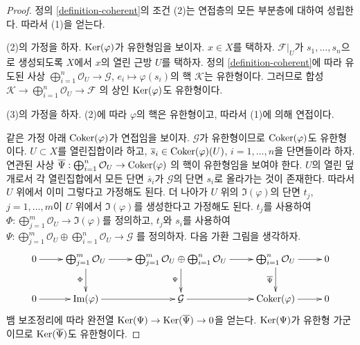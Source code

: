 \begin{proof}
정의 \ref{definition-coherent}의 조건 (2)는 연접층의 모든 부분층에
대하여 성립한다. 따라서 (1)을 얻는다.

\medskip\noindent
(2)의 가정을 하자.
$\mathop{\mathrm{Ker}}(\varphi)$가 유한형임을 보이자. $x \in X$를 택하자.
$\mathcal{F}|_U$가 $s_1, \ldots, s_n$으로 생성되도록
$X$에서 $x$의 열린 근방 $U$를 택하자.
정의 \ref{definition-coherent}에 따라 유도된 사상
$\bigoplus_{i = 1}^n \mathcal{O}_U \to \mathcal{G}$,
$e_i \mapsto \varphi(s_i)$의 핵 $\mathcal{K}$는 유한형이다.
그러므로 합성
$\mathcal{K} \to \bigoplus_{i = 1}^n \mathcal{O}_U \to \mathcal{F}$
의 상인 $\mathop{\mathrm{Ker}}(\varphi)$도 유한형이다.

\medskip\noindent
(3)의 가정을 하자.
(2)에 따라 $\varphi$의 핵은 유한형이고, 따라서 (1)에 의해 연접이다.

\medskip\noindent
같은 가정 아래 $\mathop{\mathrm{Coker}}(\varphi)$가 연접임을 보이자.
$\mathcal{G}$가 유한형이므로 $\mathop{\mathrm{Coker}}(\varphi)$도 유한형이다.
$U \subset X$를 열린집합이라 하고,
$\overline{s}_i \in \mathop{\mathrm{Coker}}(\varphi)(U)$, $i = 1, \ldots, n$을 단면들이라 하자.
연관된 사상
$\overline{\Psi} : \bigoplus_{i = 1}^n \mathcal{O}_U \to \mathop{\mathrm{Coker}}(\varphi)$
의 핵이 유한형임을 보여야 한다. $U$의 열린 덮개로서 각 열린집합에서
모든 단면 $\overline{s}_i$가 $\mathcal{G}$의 단면 $s_i$로 올라가는 것이
존재한다. 따라서 $U$ 위에서 이미 그렇다고 가정해도 된다.
더 나아가 $U$ 위의 $\Im(\varphi)$의 단면
$t_j$, $j = 1, \ldots, m$이 $U$ 위에서 $\Im(\varphi)$를 생성한다고
가정해도 된다. $t_j$를 사용하여
$\Phi : \bigoplus_{j = 1}^m \mathcal{O}_U \to \Im(\varphi)$를 정의하고,
$t_j$와 $s_i$를 사용하여
$\Psi :
\bigoplus_{j = 1}^m \mathcal{O}_U \oplus
\bigoplus_{i = 1}^n \mathcal{O}_U \to \mathcal{G}$
를 정의하자. 다음 가환 그림을 생각하자.
$$
\xymatrix{
0 \ar[r] &
\bigoplus_{j = 1}^m \mathcal{O}_U \ar[d]_\Phi \ar[r] &
\bigoplus_{j = 1}^m \mathcal{O}_U \oplus
\bigoplus_{i = 1}^n \mathcal{O}_U \ar[d]_\Psi \ar[r] &
\bigoplus_{i = 1}^n \mathcal{O}_U \ar[d]_{\overline{\Psi}} \ar[r] &
0 \\
0 \ar[r] &
\Im(\varphi) \ar[r] &
\mathcal{G} \ar[r] &
\Coker(\varphi) \ar[r] &
0
}
$$
뱀 보조정리에 따라 완전열
$\mathop{\mathrm{Ker}}(\Psi) \to \mathop{\mathrm{Ker}}(\overline{\Psi}) \to 0$을 얻는다.
$\mathop{\mathrm{Ker}}(\Psi)$가 유한형 가군이므로 $\mathop{\mathrm{Ker}}(\overline{\Psi})$도 유한형이다.


\end{proof}
